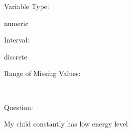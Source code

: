 \documentclass[
]{article}
\begin{document}
\begin{minipage}[t]{0.3\linewidth}

Variable Type:

\end{minipage}%
\begin{minipage}[t]{0.7\linewidth}

numeric

\end{minipage}

\begin{minipage}[t]{0.3\linewidth}

Interval:

\end{minipage}%
\begin{minipage}[t]{0.7\linewidth}

discrete

\end{minipage}

\begin{minipage}[t]{0.3\linewidth}

Range of Missing Values:

\end{minipage}%
\begin{minipage}[t]{0.7\linewidth}

~

\end{minipage}

\begin{minipage}[t]{0.3\linewidth}

Question:

\end{minipage}%
\begin{minipage}[t]{0.7\linewidth}

My child constantly has low energy level

\end{minipage}
\end{document}
